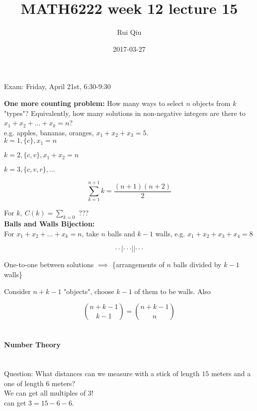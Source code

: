 \documentclass[a4paper, 11pt, twoside]{article}
\begin{document}
\title{MATH6222 week 12 lecture 15}
\author{Rui Qiu}
\date{2017-03-27}

\maketitle

Exam: Friday, April 21st, 6:30-9:30

\textbf{One more counting problem:} How many ways to select $n$ objects from $k$ "types"? Equivalently, how many solutions in non-negative integers are there to $x_1+x_2+\dots + x_k=n$?\\

e.g. apples, bananas, oranges, $x_1+x_2+x_3=5.$\\

$k=1, \{c\}, x_1 =n$

$k=2, \{c,v\}, x_1+x_2=n$

$k=3, \{c,v,r\}, \dots$

\[\sum\limits^{n+1}_{k=1}k=\frac{(n+1)(n+2)}{2}\]

For $k,\ C(k)=\sum_{k=0}$ ???\\

\textbf{Balls and Walls Bijection:}\\

For $x_1+x_2+\dots +x_k=n$, take $n$ balls and $k-1$ walls, e.g. $x_1+x_2+x_3+x_4=8$

\[\cdot\cdot|\cdot\cdot\cdot||\cdot\cdot\cdot\]

One-to-one between solutions $\implies$ \{arrangements of $n$ balls divided by $k-1$ walls\}

Consider $n+k-1$ "objects", choose $k-1$ of them to be walls. Also

\[{n+k-1\choose k-1} = {n+k-1\choose n}\]\\

\pagebreak

\paragraph{Number Theory}\ \\

Question: What distances can we measure with a stick of length $15$ meters and a one of length $6$ meters?\\

We can get all multiples of $3$!\\

can get $3=15-6-6$.\\
\end{document}
